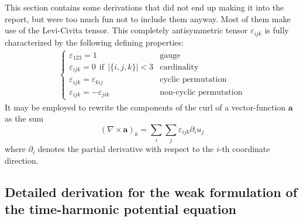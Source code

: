 \documentclass[11pt, a4paper]{article}
\begin{document}
This section contains some derivations that did not end up making it into the
report, but were too much fun not to include them anyway. Most of them make
use of the Levi-Civita tensor. This completely antisymmetric tensor
$\varepsilon_{ijk}$ is fully characterized by the following defining properties:
\begin{align}
    \begin{cases}
        \varepsilon_{123} = 1 & \text{gauge}\\
        \varepsilon_{ijk} = 0~~\text{if}~~|\{i, j, k\}| < 3 & \text{cardinality} \\
        \varepsilon_{ijk} = \varepsilon_{kij} & \text{cyclic permutation}\\
        \varepsilon_{ijk} = - \varepsilon_{jik} & \text{non-cyclic permutation}
    \end{cases}
\end{align}
It may be employed to rewrite the
components of the curl of a vector-function $\mathbf{a}$ as the sum
\begin{equation}
    (\nabla \times \mathbf{a})_k = \sum_i \sum_j \varepsilon_{ijk} \partial_i u_j \label{equ:levi-civita}
\end{equation}
where $\partial_i$ denotes the partial derivative with respect to the $i$-th coordinate
direction. 
\subsection*{Detailed derivation for the weak formulation of the time-harmonic potential equation}
\label{subsec:derivation}
\end{document}
